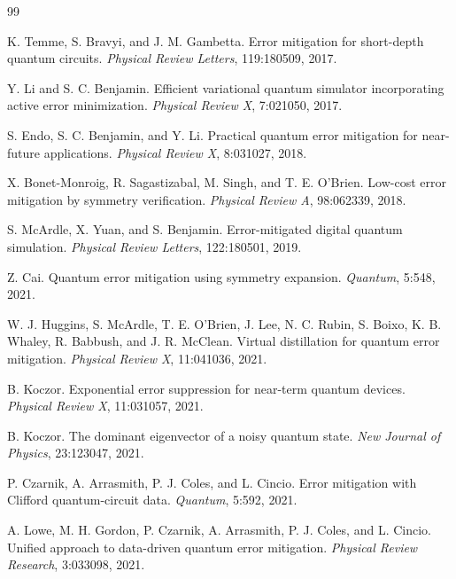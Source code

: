 \documentclass[11pt]{article}
\newcommand{\1}{\mathbf{1}}
\begin{document}
\begin{thebibliography}{99}

K. Temme, S. Bravyi, and J. M. Gambetta.
\newblock Error mitigation for short-depth quantum circuits.
\newblock \emph{Physical Review Letters}, 119:180509, 2017.

Y. Li and S. C. Benjamin.
\newblock Efficient variational quantum simulator incorporating active error minimization.
\newblock \emph{Physical Review X}, 7:021050, 2017.

S. Endo, S. C. Benjamin, and Y. Li.
\newblock Practical quantum error mitigation for near-future applications.
\newblock \emph{Physical Review X}, 8:031027, 2018.

X. Bonet-Monroig, R. Sagastizabal, M. Singh, and T. E. O'Brien.
\newblock Low-cost error mitigation by symmetry verification.
\newblock \emph{Physical Review A}, 98:062339, 2018.

S. McArdle, X. Yuan, and S. Benjamin.
\newblock Error-mitigated digital quantum simulation.
\newblock \emph{Physical Review Letters}, 122:180501, 2019.

Z. Cai.
\newblock Quantum error mitigation using symmetry expansion.
\newblock \emph{Quantum}, 5:548, 2021.

W. J. Huggins, S. McArdle, T. E. O'Brien, J. Lee, N. C. Rubin, S. Boixo, K. B. Whaley, R. Babbush, and J. R. McClean.
\newblock Virtual distillation for quantum error mitigation.
\newblock \emph{Physical Review X}, 11:041036, 2021.

B. Koczor.
\newblock Exponential error suppression for near-term quantum devices.
\newblock \emph{Physical Review X}, 11:031057, 2021.

B. Koczor.
\newblock The dominant eigenvector of a noisy quantum state.
\newblock \emph{New Journal of Physics}, 23:123047, 2021.

P. Czarnik, A. Arrasmith, P. J. Coles, and L. Cincio.
\newblock Error mitigation with Clifford quantum-circuit data.
\newblock \emph{Quantum}, 5:592, 2021.

A. Lowe, M. H. Gordon, P. Czarnik, A. Arrasmith, P. J. Coles, and L. Cincio.
\newblock Unified approach to data-driven quantum error mitigation.
\newblock \emph{Physical Review Research}, 3:033098, 2021.


\end{thebibliography}
\end{document}
